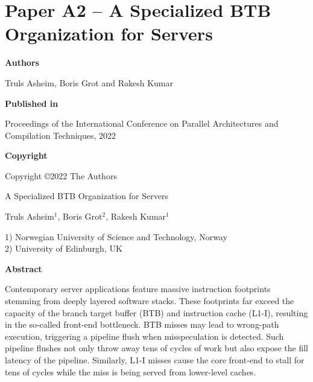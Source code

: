 \documentclass[../../../main.tex]{subfiles}
\begin{document}
\chapter{Paper A2 -- A Specialized BTB Organization for Servers}
\label{chap:pact-paper}

\noindent \textbf{Authors}

\vspace*{0.3cm}

\noindent Truls Asheim, Boris Grot and Rakesh Kumar

\vspace*{0.7cm}

\noindent \textbf{Published in}

\vspace*{0.3cm}

\noindent Proceedings of the International Conference on Parallel Architectures and Compilation Techniques, 2022

\vspace*{0.7cm}

\noindent \textbf{Copyright}

\vspace*{0.3cm}

\noindent Copyright ©2022 The Authors

\newpage

\vspace*{0.1cm}

\begin{center}

\Huge{A Specialized BTB Organization for Servers}

\vspace{0.6cm}

\large{Truls Asheim$^{1}$, Boris Grot$^{2}$, Rakesh Kumar$^{1}$}

\vspace{0.1cm}

\small{1) Norwegian University of Science and Technology, Norway}\\
\small{2) University of Edinburgh, UK}


\end{center}

\vspace{0.2cm}

\begin{center}
  \textbf{Abstract}
  \end{center}
\begin{changemargin}{0.75cm}{0.75cm}
Contemporary server applications feature massive instruction footprints stemming from deeply layered software stacks. These footprints far exceed the capacity of the branch target buffer (BTB) and instruction cache (L1-I), resulting in the so-called front-end bottleneck. BTB misses may lead to wrong-path execution, triggering a pipeline flush when misspeculation is detected. Such pipeline flushes not only throw away tens of cycles of work but also expose the fill latency of the pipeline. Similarly, L1-I misses cause the core front-end to stall for tens of cycles while the miss is being served from lower-level caches.
\end{changemargin}
\end{document}
